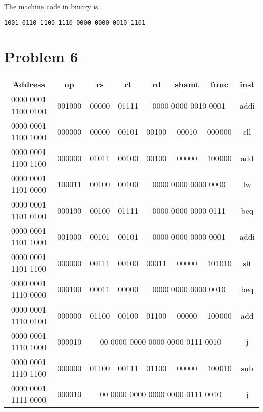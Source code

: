 \documentclass[12pt]{article}
\begin{document}
The machine code in binary is
\begin{verbatim}
1001 0110 1100 1110 0000 0000 0010 1101
\end{verbatim}

\section*{Problem 6}

\begin{center}
        \hspace*{-1cm}
        \begin{tabular}{|c||c|c|c|c|c|c|c|}
                \hline
                Address & op & rs & rt & rd & shamt & func & inst \\
                \hline\hline
                0000 0001 1100 0100 & 001000 & 00000 & 01111 & \multicolumn{3}{|c|}{0000 0000 0010 0001} & addi\\
                \hline
                0000 0001 1100 1000 & 000000 & 00000 & 00101 & 00100 & 00010 & 000000 & sll\\
                \hline
                0000 0001 1100 1100 & 000000 & 01011 & 00100 & 00100 & 00000 & 100000& add\\
                \hline
                0000 0001 1101 0000 & 100011 & 00100 & 00100 & \multicolumn{3}{|c|}{0000 0000 0000 0000} & lw\\
                \hline
                0000 0001 1101 0100 & 000100 & 00100 & 01111 & \multicolumn{3}{|c|}{0000 0000 0000 0111} & beq\\
                \hline
                0000 0001 1101 1000 & 001000 & 00101 & 00101 & \multicolumn{3}{|c|}{0000 0000 0000 0001} & addi\\
                \hline
                0000 0001 1101 1100 & 000000 & 00111 & 00100 & 00011 & 00000 & 101010 & slt\\
                \hline
                0000 0001 1110 0000 & 000100 & 00011 & 00000 & \multicolumn{3}{|c|}{0000 0000 0000 0010} & beq\\
                \hline
                0000 0001 1110 0100 & 000000 & 01100 & 00100 & 01100 & 00000 & 100000 & add\\
                \hline
                0000 0001 1110 1000 & 000010 & \multicolumn{5}{|c|}{00 0000 0000 0000 0000 0111 0010} & j\\
                \hline
                0000 0001 1110 1100 & 000000 & 01100 & 00111 & 01100 & 00000 & 100010 & sub\\
                \hline
                0000 0001 1111 0000 & 000010 & \multicolumn{5}{|c|}{00 0000 0000 0000 0000 0111 0010} & j\\
                \hline
        \end{tabular}
        \hspace*{-1cm}
\end{center}
\end{document}
